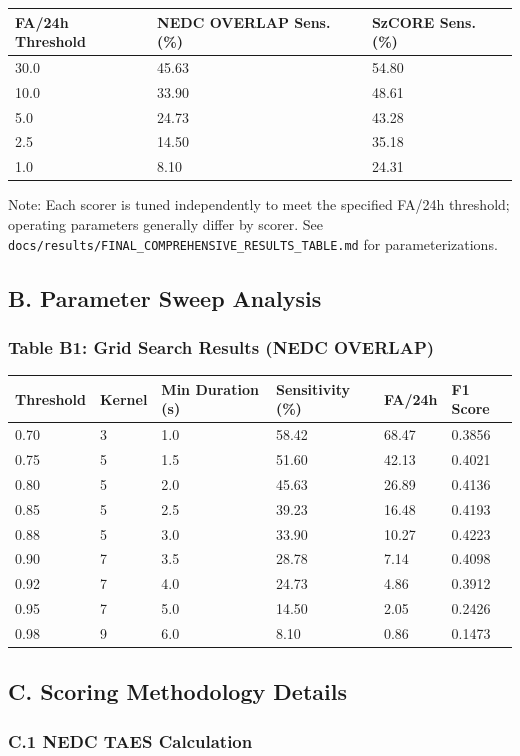 \documentclass[
  10pt,
]{article}
\begin{document}
\begin{longtable}[]{@{}lll@{}}
\toprule
FA/24h Threshold & NEDC OVERLAP Sens. (\%) & SzCORE Sens.
(\%)\tabularnewline
\midrule
\endhead
30.0 & 45.63 & 54.80\tabularnewline
10.0 & 33.90 & 48.61\tabularnewline
5.0 & 24.73 & 43.28\tabularnewline
2.5 & 14.50 & 35.18\tabularnewline
1.0 & 8.10 & 24.31\tabularnewline
\bottomrule
\end{longtable}

Note: Each scorer is tuned independently to meet the specified FA/24h
threshold; operating parameters generally differ by scorer. See
\texttt{docs/results/FINAL\_COMPREHENSIVE\_RESULTS\_TABLE.md} for
parameterizations.

\hypertarget{b.-parameter-sweep-analysis}{%
\subsection{B. Parameter Sweep
Analysis}\label{b.-parameter-sweep-analysis}}

\hypertarget{table-b1-grid-search-results-nedc-overlap}{%
\subsubsection{Table B1: Grid Search Results (NEDC
OVERLAP)}\label{table-b1-grid-search-results-nedc-overlap}}

\begin{longtable}[]{@{}llllll@{}}
\toprule
Threshold & Kernel & Min Duration (s) & Sensitivity (\%) & FA/24h & F1
Score\tabularnewline
\midrule
\endhead
0.70 & 3 & 1.0 & 58.42 & 68.47 & 0.3856\tabularnewline
0.75 & 5 & 1.5 & 51.60 & 42.13 & 0.4021\tabularnewline
0.80 & 5 & 2.0 & 45.63 & 26.89 & 0.4136\tabularnewline
0.85 & 5 & 2.5 & 39.23 & 16.48 & 0.4193\tabularnewline
0.88 & 5 & 3.0 & 33.90 & 10.27 & 0.4223\tabularnewline
0.90 & 7 & 3.5 & 28.78 & 7.14 & 0.4098\tabularnewline
0.92 & 7 & 4.0 & 24.73 & 4.86 & 0.3912\tabularnewline
0.95 & 7 & 5.0 & 14.50 & 2.05 & 0.2426\tabularnewline
0.98 & 9 & 6.0 & 8.10 & 0.86 & 0.1473\tabularnewline
\bottomrule
\end{longtable}

\hypertarget{c.-scoring-methodology-details}{%
\subsection{C. Scoring Methodology
Details}\label{c.-scoring-methodology-details}}

\hypertarget{c.1-nedc-taes-calculation}{%
\subsubsection{C.1 NEDC TAES
Calculation}\label{c.1-nedc-taes-calculation}}
\end{document}
